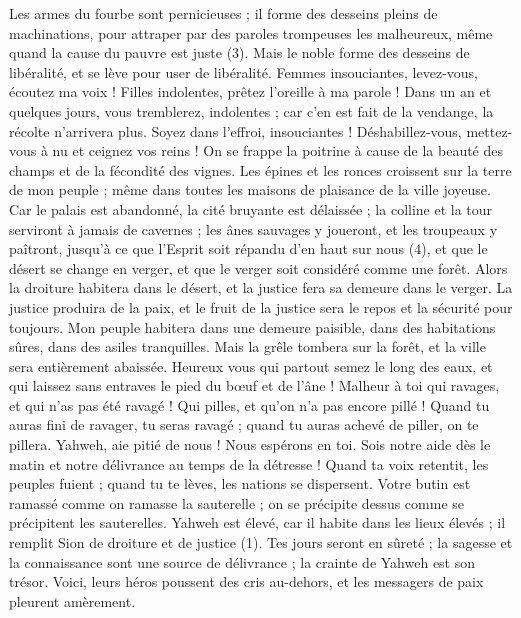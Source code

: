 \begin{multicols}{2}
Les armes du fourbe sont pernicieuses ; il forme des desseins pleins de machinations, pour attraper par des paroles trompeuses les malheureux, même quand la cause du pauvre est juste (3).
Mais le noble forme des desseins de libéralité, et se lève pour user de libéralité.
Femmes insouciantes, levez-vous, écoutez ma voix ! Filles indolentes, prêtez l'oreille à ma parole !
Dans un an et quelques jours, vous tremblerez, indolentes ; car c’en est fait de la vendange, la récolte n’arrivera plus.
Soyez dans l’effroi, insouciantes ! Déshabillez-vous, mettez-vous à nu et ceignez vos reins !
On se frappe la poitrine à cause de la beauté des champs et de la fécondité des vignes.
Les épines et les ronces croissent sur la terre de mon peuple ; même dans toutes les maisons de plaisance de la ville joyeuse.
Car le palais est abandonné, la cité bruyante est délaissée ; la colline et la tour serviront à jamais de cavernes ; les ânes sauvages y joueront, et les troupeaux y paîtront,
jusqu'à ce que l'Esprit soit répandu d'en haut sur nous (4), et que le désert se change en verger, et que le verger soit considéré comme une forêt.
Alors la droiture habitera dans le désert, et la justice fera sa demeure dans le verger.
La justice produira de la paix, et le fruit de la justice sera le repos et la sécurité pour toujours.
Mon peuple habitera dans une demeure paisible, dans des habitations sûres, dans des asiles tranquilles.
Mais la grêle tombera sur la forêt, et la ville sera entièrement abaissée.
Heureux vous qui partout semez le long des eaux, et qui laissez sans entraves le pied du bœuf et de l'âne !
\VerseOne{}Malheur à toi qui ravages, et qui n'as pas été ravagé ! Qui pilles, et qu’on n’a pas encore pillé ! Quand tu auras fini de ravager, tu seras ravagé ; quand tu auras achevé de piller, on te pillera.
Yahweh, aie pitié de nous ! Nous espérons en toi. Sois notre aide dès le matin et notre délivrance au temps de la détresse !
Quand ta voix retentit, les peuples fuient ; quand tu te lèves, les nations se dispersent.
Votre butin est ramassé comme on ramasse la sauterelle ; on se précipite dessus comme se précipitent les sauterelles.
Yahweh est élevé, car il habite dans les lieux élevés ; il remplit Sion de droiture et de justice (1).
Tes jours seront en sûreté ; la sagesse et la connaissance sont une source de délivrance ; la crainte de Yahweh est son trésor.
Voici, leurs héros poussent des cris au-dehors, et les messagers de paix pleurent amèrement.

\end{multicols}
